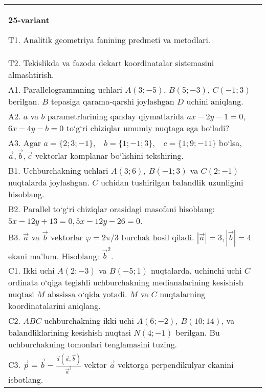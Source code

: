 \documentclass{article}
\begin{document}
\begin{tabular}{m{17cm}}
\textbf{25-variant}
\newline

T1. Analitik geometriya fanining predmeti va metodlari.
 \\
T2. Tekislikda va fazoda dekart koordinatalar sistemasini almashtirish.
 \\
A1. 
Parallelogrammning uchlari
$A (3;-5) $, $B (5;-3) $, $C (-1;3) $ berilgan. $B$ tepasiga
qarama-qarshi joylashgan $D$ uchini aniqlang.
 \\
A2. 
$a$ va $b$ parametrlarining qanday qiymatlarida
$ax-2y-1=0$, $6x-4y-b=0$ to‘g‘ri chiziqlar umumiy nuqtaga ega bo‘ladi?
 \\
A3. 
Agar \(a = \{ 2;3; - 1\}, \ \ \ \ b = \{ 1; - 1;3\}, \ \ \ \ c = \{ 1;9; - 11\}\) bo‘lsa, $\overrightarrow{a}, \overrightarrow{b}, \overrightarrow{c}$ vektorlar komplanar bo‘lishini tekshiring.
 \\
B1. 
Uchburchakning uchlari \(A (3;6),\ B (-1;3) \) va
\(C (2:-1) \) nuqtalarda joylashgan. $C$ uchidan tushirilgan balandlik uzunligini hisoblang.
 \\
B2. 
Parallel to‘g‘ri chiziqlar orasidagi masofani hisoblang: $5x-12y+13=0, 5x-12y-26=0$.
 \\
B3. 
$\vec{a}$ va $\vec{b}$ vektorlar $\varphi = 2\pi/3$ burchak hosil qiladi. $|\vec{a}| = 3,|\vec{b}| = 4$ ekani ma’lum. Hisoblang:
${\vec{b}}^{2}$.
 \\
C1. 
Ikki uchi \(A (2; - 3) \) va \(B (-5;1) \) nuqtalarda,
uchinchi uchi $C$ ordinata o‘qiga tegishli uchburchakning
medianalarining kesishish nuqtasi $M$ abssissa o‘qida yotadi.
$M$ va $C$ nuqtalarning koordinatalarini aniqlang.
 \\
C2. 
$ABC$ uchburchakning ikki uchi
\(A (6; - 2),\ B (10;14) \), va balandliklarining kesishish nuqtasi
\(N (4; - 1) \) berilgan. Bu uchburchakning tomonlari tenglamasini tuzing.
 \\
C3. 
\(\vec{p} = \vec{b} - \frac{\vec{a} (\vec{a},\vec{b}) }{{\vec{a}}^{2}}\) vektor \(\vec{a}\) vektorga perpendikulyar ekanini isbotlang.
 \\

\end{tabular}
\vspace{1cm}
\end{document}
